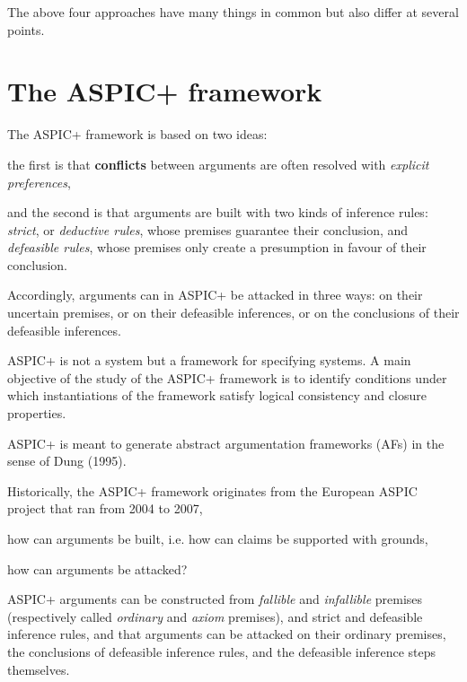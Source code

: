 The above four approaches have many things in common but also differ at several points.



\clearpage
\section{The ASPIC+ framework}


The ASPIC+ framework is based on two ideas: 

the first is that {\color{purple} \textbf{conflicts} between arguments are often resolved with \textit{explicit preferences}}, 

and the second is that {\color{purple} arguments are built with two kinds of inference rules}: 
\textit{strict}, or \textit{deductive rules}, whose premises guarantee their conclusion, 
and \textit{defeasible rules}, whose premises only create a presumption in favour of their conclusion. 

Accordingly, 
arguments can in ASPIC+ be attacked in three ways: on their uncertain premises, or on their defeasible inferences, or on the conclusions of their defeasible inferences. 

ASPIC+ is not a system but a framework for specifying systems. 
A main objective of the study of the ASPIC+ framework is to identify conditions under which instantiations of the framework satisfy logical consistency and closure properties.


\dotfill

ASPIC+ is meant to generate abstract argumentation frameworks (AFs) in the sense of Dung (1995).

\vspace{1.5em}

Historically, 
the ASPIC+ framework originates from the European ASPIC project that ran from 2004 to 2007, 




\vspace{1.5em}

how can arguments be built, i.e. how can claims be supported with grounds,

how can arguments be attacked?



\vspace{1.5em}


ASPIC+ arguments can be constructed from \textit{fallible} and \textit{infallible} premises (respectively called \textit{ordinary} and \textit{axiom} premises), 
and strict and defeasible inference rules, 
and that arguments can be attacked on their ordinary premises, 
the conclusions of defeasible inference rules, and the defeasible inference steps themselves.




